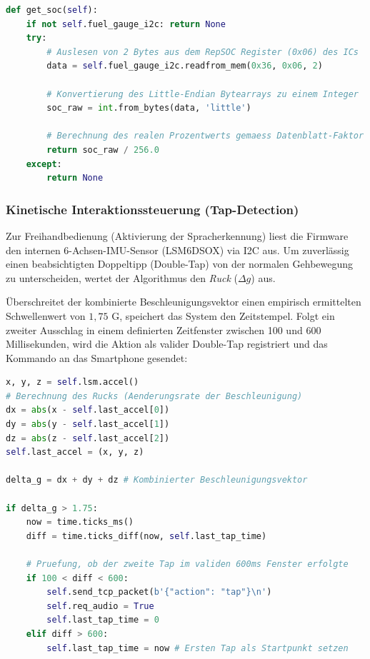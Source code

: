 \begin{lstlisting}[language=Python, caption={Direkte I2C-Registerauslesung des State-of-Charge (SOC) vom MAX17262}]
def get_soc(self):
    if not self.fuel_gauge_i2c: return None
    try:
        # Auslesen von 2 Bytes aus dem RepSOC Register (0x06) des ICs
        data = self.fuel_gauge_i2c.readfrom_mem(0x36, 0x06, 2)
        
        # Konvertierung des Little-Endian Bytearrays zu einem Integer
        soc_raw = int.from_bytes(data, 'little')
        
        # Berechnung des realen Prozentwerts gemaess Datenblatt-Faktor
        return soc_raw / 256.0 
    except:
        return None
\end{lstlisting}

\subsubsection*{Kinetische Interaktionssteuerung (Tap-Detection)}
Zur Freihandbedienung (Aktivierung der Spracherkennung) liest die Firmware den internen 6-Achsen-IMU-Sensor (LSM6DSOX) via I2C aus. Um zuverlässig einen beabsichtigten Doppeltipp (Double-Tap) von der normalen Gehbewegung zu unterscheiden, wertet der Algorithmus den \textit{Ruck} ($\Delta g$) aus.

Überschreitet der kombinierte Beschleunigungsvektor einen empirisch ermittelten Schwellenwert von $1,75$ G, speichert das System den Zeitstempel. Folgt ein zweiter Ausschlag in einem definierten Zeitfenster zwischen 100 und 600 Millisekunden, wird die Aktion als valider Double-Tap registriert und das Kommando an das Smartphone gesendet:

\begin{lstlisting}[language=Python, caption={Filterung von Störbewegungen und Berechnung der Differenz\-beschleunigung}]
x, y, z = self.lsm.accel()
# Berechnung des Rucks (Aenderungsrate der Beschleunigung)
dx = abs(x - self.last_accel[0])
dy = abs(y - self.last_accel[1])
dz = abs(z - self.last_accel[2])
self.last_accel = (x, y, z)

delta_g = dx + dy + dz # Kombinierter Beschleunigungsvektor

if delta_g > 1.75:
    now = time.ticks_ms()
    diff = time.ticks_diff(now, self.last_tap_time)
    
    # Pruefung, ob der zweite Tap im validen 600ms Fenster erfolgte
    if 100 < diff < 600:
        self.send_tcp_packet(b'{"action": "tap"}\n')
        self.req_audio = True 
        self.last_tap_time = 0
    elif diff > 600:
        self.last_tap_time = now # Ersten Tap als Startpunkt setzen
\end{lstlisting}

